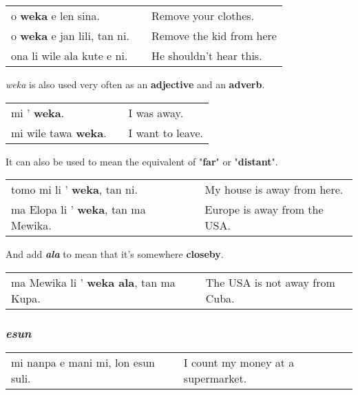 \begin{supertabular}{p{5,5cm}|ll}
o \textbf{weka} e len sina. && Remove your clothes. \\
o \textbf{weka} e jan lili, tan ni. && Remove the kid from here \\ 
ona li wile ala kute e ni. && He shouldn't hear this. \\ 
\end{supertabular} 

\textit{weka} is also used very often as an \textbf{adjective} and an \textbf{adverb}. 

\begin{supertabular}{p{5,5cm}|ll}
mi ' \textbf{weka}. && I was away. \\
mi wile tawa \textbf{weka}. && I want to leave. \\
\end{supertabular} 

It can also be used to mean the equivalent of "\textbf{far}" or "\textbf{distant}". 

\begin{supertabular}{p{5,5cm}|ll}
tomo mi li ' \textbf{weka}, tan ni. && My house is away from here. \\
ma Elopa li ' \textbf{weka}, tan ma Mewika. && Europe is away from the USA. \\
\end{supertabular} 

And add \textbf{\textit{ala}} to mean that it's somewhere \textbf{closeby}. 

\begin{supertabular}{p{5,5cm}|ll}
ma Mewika li ' \textbf{weka ala}, tan ma Kupa. && The USA is not away from Cuba. \\
\end{supertabular} 

\subsubsection*{\textit{esun}}

\begin{supertabular}{p{5,5cm}|ll}
mi nanpa e mani mi, lon esun suli. && I count my money at a supermarket. \\
\end{supertabular}
%
